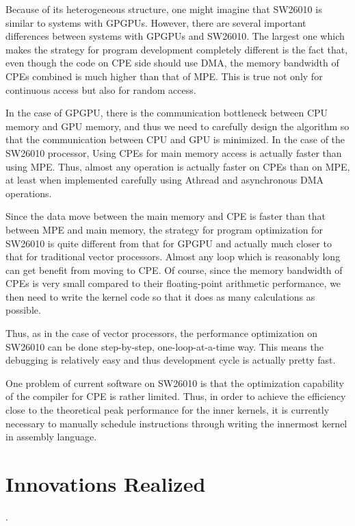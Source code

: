 \documentclass[sigconf]{acmart}
\begin{document}
Because of its heterogeneous structure, one might imagine that SW26010 is
similar to systems with GPGPUs. However, there are several important
differences between systems with GPGPUs and SW26010. The largest one
which makes the strategy for program development completely different
is the fact that, even though the code on CPE side should use DMA, the
memory bandwidth of CPEs combined is much higher than that of
MPE. This is true not only for continuous access but also for random
access.

In the case of GPGPU, there is the communication  bottleneck between
CPU memory and GPU memory, and thus we need to carefully design the
algorithm so that the communication between CPU and GPU is minimized.
In the case of the SW26010 processor, Using CPEs for main memory
access is actually faster than using MPE. Thus, almost any operation
is actually faster on CPEs than on MPE, at least when implemented
carefully using Athread and asynchronous DMA operations. 

Since the data move between the main memory and CPE is faster than
that between MPE and main memory, the strategy for program
optimization for SW26010 is quite different from that for GPGPU and
actually much closer to that for traditional vector processors. Almost
any loop which is reasonably long can get benefit from moving to CPE.
Of course, since the memory bandwidth of CPEs is very small compared
to their floating-point arithmetic performance, we then need to write
the kernel code so that it does as many calculations as possible.

Thus, as in the case of vector processors, the performance
optimization on SW26010 can be done step-by-step, one-loop-at-a-time
way. This means the debugging is relatively easy and thus development
cycle is actually pretty fast.

One problem of current software on SW26010 is that the optimization
capability of the compiler for CPE is rather limited. Thus, in order
to achieve the efficiency close to the theoretical peak performance
for the inner kernels, it is currently necessary to manually schedule
instructions through writing the innermost kernel in assembly
language. 


\section{Innovations Realized}
  \label{sect:innovation}.
\end{document}
